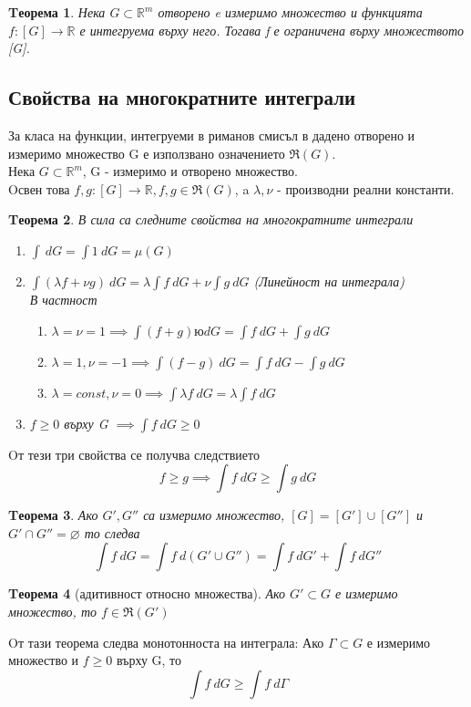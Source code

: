 \documentclass[a4paper,fleqn,12pt]{article}
\newtheorem{theorem}{Tеорема}[subsection]
\theoremstyle{definition}
\begin{document}
\begin{theorem}
Нека $G \subset \mathbb{R}^m$ отворено e измеримо множество и функцията $f: [G] \to \mathbb{R}$ е интегруема върху него. Тогава f  е ограничена върху множеството [G]. 
\end{theorem}

\subsection{Свойства на многократните интеграли}
За класа на функции, интегруеми в риманов смисъл в дадено отворено и измеримо множество G е използвано означението $\Re(G)$. \\
Нека $G \subset \mathbb{R}^m$, G - измеримо и отворено множество.\\
Oсвен това $f,g: [G] \to \mathbb{R}, f,g \in \Re(G)$, a $\lambda, \nu$ - производни реални константи.

\begin{theorem}
В сила са следните свойства на многократните интеграли
\begin{enumerate}
\item $\int \ dG = \int 1 \ dG = \mu(G)$
\item $\int (\lambda f + \nu g) \ dG = \lambda \int f \ dG + \nu \int g \ dG$ (Линейност на интеграла)\\
В частност
\begin{enumerate}
\item $\lambda = \nu = 1 \implies \int (f+g) ю dG  = \int f \ dG + \int g \ dG$ 
\item $\lambda = 1,  \nu = -1 \implies \int (f-g) \ dG  = \int f \ dG - \int g \ dG$ 
\item $\lambda = const,  \nu = 0 \implies \int \lambda f \ dG  = \lambda \int f \ dG$ 
\end{enumerate}
\item $f \geq 0$ върху G $\implies \int f \ dG \geq 0$
\end{enumerate}
\end{theorem}
Oт тези три свойства се получва следствието 
$$f \geq g \implies \int f \ dG \geq \int g \ dG$$

\begin{theorem}
Ако $G', G''$ са измеримо множество, $[G] = [G'] \cup [G'']$ и $G' \cap G'' = \varnothing$ то следва
$$\int f \ dG = \int f \ d(G' \cup G'') =\int f \ dG' + \int f \ dG'' $$
\end{theorem}

\begin{theorem}[адитивност относно множества]
Ако $G' \subset G$ е измеримо множество, то $f \in \Re(G')$
\end{theorem}
Oт тази теорема следва монотонноста на интеграла: Ако $\Gamma \subset G$ е измеримо множество и $f \geq 0$ върху  G, то 
$$\int f \ dG \geq \int f \ d\Gamma$$
\end{document}
